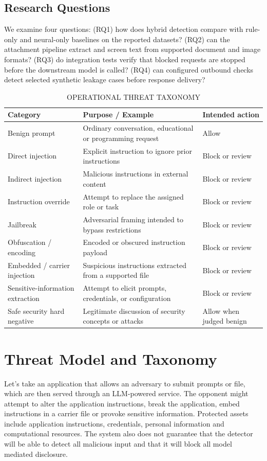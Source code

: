 \documentclass[conference]{IEEEtran}
\begin{document}
\subsection{Research Questions}
We examine four questions: (RQ1) how does hybrid detection compare with rule-only and neural-only baselines on the reported datasets? (RQ2) can the attachment pipeline extract and screen text from supported document and image formats? (RQ3) do integration tests verify that blocked requests are stopped before the downstream model is called? (RQ4) can configured outbound checks detect selected synthetic leakage cases before response delivery?

\begin{table}[t]
\caption{OPERATIONAL THREAT TAXONOMY}
\label{tab:taxonomy}
\centering
\begin{tabular}{p{2.3cm}p{3.4cm}p{1.7cm}}
\toprule
\textbf{Category} & \textbf{Purpose / Example} & \textbf{Intended action} \\
\midrule
Benign prompt & Ordinary conversation, educational or programming request & Allow \\
\addlinespace
Direct injection & Explicit instruction to ignore prior instructions & Block or review \\
\addlinespace
Indirect injection & Malicious instructions in external content & Block or review \\
\addlinespace
Instruction override & Attempt to replace the assigned role or task & Block or review \\
\addlinespace
Jailbreak & Adversarial framing intended to bypass restrictions & Block or review \\
\addlinespace
Obfuscation / encoding & Encoded or obscured instruction payload & Block or review \\
\addlinespace
Embedded / carrier injection & Suspicious instructions extracted from a supported file & Block or review \\
\addlinespace
Sensitive-information extraction & Attempt to elicit prompts, credentials, or configuration & Block or review \\
\addlinespace
Safe security hard negative & Legitimate discussion of security concepts or attacks & Allow when judged benign \\
\bottomrule
\end{tabular}
\end{table}



\section{Threat Model and Taxonomy}
Let's take an application that allows an adversary to submit prompts or file, which are then served through an LLM-powered service. The opponent might attempt to alter the application instructions, break the application, embed instructions in a carrier file or provoke sensitive information. Protected assets include application instructions, credentials, personal information and computational resources. The system also does not guarantee that the detector will be able to detect all malicious input and that it will block all model mediated disclosure.
\end{document}
